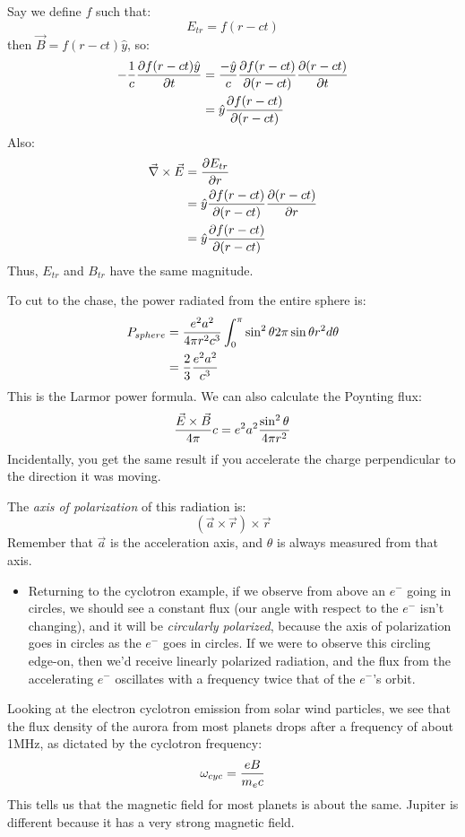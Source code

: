 \documentclass[11pt]{article}
\def\^{\hat}
\def\tr{\nabla}
\def\dce{\vec\tr\times\vec E}
\begin{document}
Say we define $f$ such that:
$$E_{tr}=f(r-ct)$$
then $\vec B=f(r-ct)\^y$, so:
$$\begin{aligned}-{1\over c}{\partial f(r-ct)\^y\over \partial t}
&={-\^y\over c}{\partial f(r-ct)\over \partial(r-ct)}{\partial(r-ct)\over
\partial t}\\ 
&=\^y{\partial f(r-ct)\over\partial(r-ct)}\\ \end{aligned}$$
Also:
$$\begin{aligned}\dce&={\partial E_{tr}\over\partial r}\\ 
&=\^y{\partial f(r-ct)\over\partial(r-ct)}{\partial(r-ct)\over\partial r}\\ 
&=\^y{\partial f(r-ct)\over\partial(r-ct)}\\ \end{aligned}$$
Thus, $E_{tr}$ and $B_{tr}$ have the same magnitude.\par
To cut to the chase, the power radiated from the entire sphere is:
$$\begin{aligned}P_{sphere}&={e^2a^2\over4\pi r^2c^3}\int_0^\pi{\sin^2\theta 
2\pi\sin\theta r^2d\theta}\\ 
&={2\over3}{e^2a^2\over c^3}\\ \end{aligned}$$
This is the Larmor power formula.  We can also calculate the Poynting flux:
$${\vec E\times\vec B\over4\pi}c=e^2a^2{\sin^2\theta\over4\pi r^2}$$
Incidentally, you get the same result if you accelerate the charge perpendicular
to the direction it was moving.\par
The {\it axis of polarization} of this radiation is:
$$(\vec a\times\vec r)\times\vec r$$
Remember that $\vec a$ is the acceleration axis, and $\theta$ is always measured
from that axis.
\begin{itemize}
\item Returning to the cyclotron example, if we observe from above
an $e^-$ going in circles, we should see a constant flux (our angle with respect
to the $e^-$ isn't changing), and it will be {\it circularly polarized}, 
because the axis of polarization goes in circles as the $e^-$ goes in circles.
If we were to observe this circling edge-on, then we'd receive linearly
polarized radiation, and the flux from the accelerating $e^-$ oscillates
with a frequency twice that of the $e^-$'s orbit.
\end{itemize}

Looking at the electron cyclotron emission from solar wind particles, we see
that the flux density of the aurora from most planets drops after a frequency
of about 1MHz, as dictated by the cyclotron frequency:
$$\omega_{cyc}={eB\over m_ec}$$
This tells us that the magnetic field for most planets is about the same.
Jupiter is different because it has a very strong magnetic field.
\end{document}
